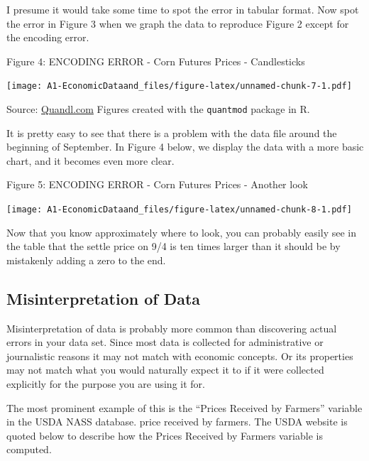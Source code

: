 \documentclass[]{book}
\theoremstyle{definition}
\theoremstyle{definition}
\theoremstyle{remark}
\begin{document}
I presume it would take some time to spot the error in tabular format.
Now spot the error in Figure 3 when we graph the data to reproduce
Figure 2 except for the encoding error.

Figure 4: ENCODING ERROR - Corn Futures Prices - Candlesticks

\texttt{[image: A1-EconomicDataand\_files/figure-latex/unnamed-chunk-7-1.pdf]}

Source:
\href{https://www.quandl.com/data/CME/CZ2015-Corn-Futures-December-2015-CZ2015}{Quandl.com}
Figures created with the \texttt{quantmod} package in R.

It is pretty easy to see that there is a problem with the data file
around the beginning of September. In Figure 4 below, we display the
data with a more basic chart, and it becomes even more clear.

Figure 5: ENCODING ERROR - Corn Futures Prices - Another look

\texttt{[image: A1-EconomicDataand\_files/figure-latex/unnamed-chunk-8-1.pdf]}

Now that you know approximately where to look, you can probably easily
see in the table that the settle price on 9/4 is ten times larger than
it should be by mistakenly adding a zero to the end.

\subsection{Misinterpretation of Data}\label{misinterpretation-of-data}

Misinterpretation of data is probably more common than discovering
actual errors in your data set. Since most data is collected for
administrative or journalistic reasons it may not match with economic
concepts. Or its properties may not match what you would naturally
expect it to if it were collected explicitly for the purpose you are
using it for.

The most prominent example of this is the ``Prices Received by Farmers''
variable in the USDA NASS database. price received by farmers. The USDA
website is quoted below to describe how the Prices Received by Farmers
variable is computed.
\end{document}
